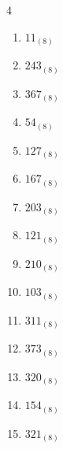 \begin{multicols}{4}
\begin{enumerate}
  \item $11_{(8)}$

        \phantom{$=9$}

  \item $243_{(8)}$

        \phantom{$=163$}

  \item $367_{(8)}$

        \phantom{$=247$}

\columnbreak %

\resetques

  \item $54_{(8)}$

        \phantom{$=44$}

  \item $127_{(8)}$

        \phantom{$=87$}

  \item $167_{(8)}$

        \phantom{$=119$}

  \item $203_{(8)}$

        \phantom{$=131$}

  \item $121_{(8)}$

        \phantom{$=81$}

  \item $210_{(8)}$

        \phantom{$=136$}

  \item $103_{(8)}$

        \phantom{$=67$}

  \item $311_{(8)}$

        \phantom{$=201$}

  \item $373_{(8)}$

        \phantom{$=251$}

  \item $320_{(8)}$

        \phantom{$=208$}

  \item $154_{(8)}$

        \phantom{$=108$}

  \item $321_{(8)}$

        \phantom{$=209$}


\end{enumerate}
\end{multicols}
